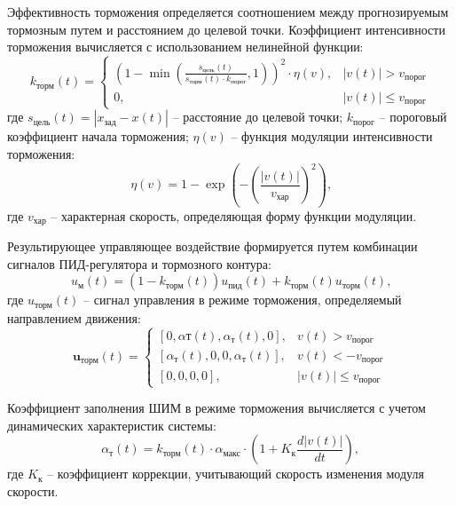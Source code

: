 Эффективность торможения определяется соотношением между прогнозируемым тормозным путем
и расстоянием до целевой точки. Коэффициент интенсивности торможения вычисляется с использованием нелинейной функции:
\begin{equation*}\label{eq:braking_intensity_expanded}
	k_{\text{торм}}(t) = \begin{cases}
		\left(1 - \min\left(\frac{s_{\text{цель}}(t)}{s_{\text{торм}}(t) \cdot k_{\text{порог}}}, 1\right)\right)^2 \cdot \eta(v), & |v(t)| > v_{\text{порог}}    \\
		0,                                                                                                                         & |v(t)| \leq v_{\text{порог}}
	\end{cases}
\end{equation*}
где $s_{\text{цель}}(t) = |x_{\text{зад}} - x(t)|$ -- расстояние до целевой точки;
$k_{\text{порог}}$ -- пороговый коэффициент начала торможения;
$\eta(v)$ -- функция модуляции интенсивности торможения:
\begin{equation*}\label{eq:modulation_function}
	\eta(v) = 1 - \exp\left(-\left(\frac{|v(t)|}{v_{\text{хар}}}\right)^2\right)\text{,}
\end{equation*}
где $v_{\text{хар}}$ -- характерная скорость, определяющая форму функции модуляции.

Результирующее управляющее воздействие формируется путем комбинации сигналов ПИД-регулятора и тормозного контура:
\begin{equation*}\label{eq:combined_control}
	u_{\text{м}}(t) = (1 - k_{\text{торм}}(t))u_{\text{пид}}(t) + k_{\text{торм}}(t)u_{\text{торм}}(t)\text{,}
\end{equation*}
где $u_{\text{торм}}(t)$ -- сигнал управления в режиме торможения, определяемый направлением движения:
\begin{equation*}\label{eq:braking_control_expanded}
	\mathbf{u}_{\text{торм}}(t) = \begin{cases}
		[0, \alpha{\text{т}}(t), \alpha_{\text{т}}(t), 0],  & v(t) > v_{\text{порог}}      \\
		[\alpha_{\text{т}}(t), 0, 0, \alpha_{\text{т}}(t)], & v(t) < -v_{\text{порог}}     \\
		[0, 0, 0, 0],                                       & |v(t)| \leq v_{\text{порог}}
	\end{cases}
\end{equation*}

Коэффициент заполнения ШИМ в режиме торможения вычисляется с учетом динамических характеристик системы:
\begin{equation*}\label{eq:braking_pwm_expanded}
	\alpha_{\text{т}}(t) = k_{\text{торм}}(t) \cdot \alpha_{\text{макс}} \cdot \left(1 + K_{\text{к}}\frac{d|v(t)|}{dt}\right),
\end{equation*}
где $K_{\text{к}}$ -- коэффициент коррекции, учитывающий скорость изменения модуля скорости.


